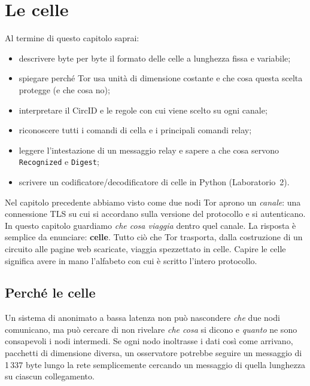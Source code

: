 \chapter{Le celle}\label{cap:08-celle}

\begin{obiettivi}
Al termine di questo capitolo saprai:
\begin{itemize}[nosep]
  \item descrivere byte per byte il formato delle celle a lunghezza fissa e variabile;
  \item spiegare perché Tor usa unità di dimensione costante e che cosa questa scelta protegge (e che cosa no);
  \item interpretare il CircID e le regole con cui viene scelto su ogni canale;
  \item riconoscere tutti i comandi di cella e i principali comandi relay;
  \item leggere l'intestazione di un messaggio relay e sapere a che cosa servono \texttt{Recognized} e \texttt{Digest};
  \item scrivere un codificatore/decodificatore di celle in Python (Laboratorio~2).
\end{itemize}
\end{obiettivi}

Nel capitolo precedente abbiamo visto come due nodi Tor aprono un \emph{canale}: una connessione TLS su cui si accordano sulla versione del protocollo e si autenticano. In questo capitolo guardiamo \emph{che cosa viaggia} dentro quel canale. La risposta è semplice da enunciare: \textbf{celle}. Tutto ciò che Tor trasporta, dalla costruzione di un circuito alle pagine web scaricate, viaggia spezzettato in celle. Capire le celle significa avere in mano l'alfabeto con cui è scritto l'intero protocollo.

\section{Perché le celle}\label{sec:celle-perche}

Un sistema di anonimato a bassa latenza non può nascondere \emph{che} due nodi comunicano, ma può cercare di non rivelare \emph{che cosa} si dicono e \emph{quanto} ne sono consapevoli i nodi intermedi. Se ogni nodo inoltrasse i dati così come arrivano, pacchetti di dimensione diversa, un osservatore potrebbe seguire un messaggio di 1\,337 byte lungo la rete semplicemente cercando un messaggio di quella lunghezza su ciascun collegamento.

